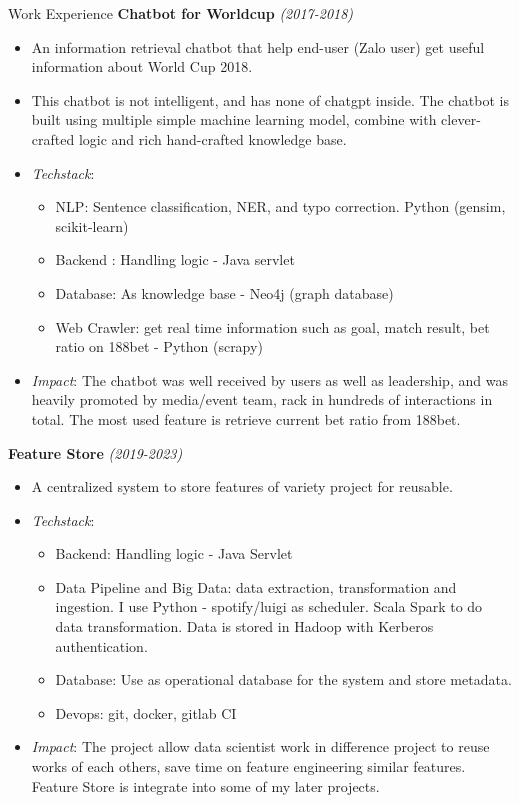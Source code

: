 \documentclass{resume} %
\begin{document}
\begin{rSection}{Work Experience}
\textbf{Chatbot for Worldcup} \textit{(2017-2018)}

\begin{itemize}
    \item An information retrieval chatbot that help end-user (Zalo user) get useful information about World Cup 2018.
    \item This chatbot is not intelligent, and has none of chatgpt inside. The chatbot is built using multiple simple machine learning model, combine with clever-crafted logic and rich hand-crafted knowledge base.
    \item \textit{Techstack}: 
    \begin{itemize}
            \item NLP: Sentence classification, NER, and typo correction. Python (gensim, scikit-learn)
            \item Backend : Handling logic - Java servlet
            \item Database: As knowledge base - Neo4j (graph database)
            \item Web Crawler: get real time information such as goal, match result, bet ratio on 188bet - Python (scrapy)
    \end{itemize}
    \item \textit{Impact}: The chatbot was well received by users as well as leadership, and was heavily promoted by media/event team, rack in hundreds of interactions in total. The most used feature is retrieve current bet ratio from 188bet.
\end{itemize}


\textbf{Feature Store} \textit{(2019-2023)}
\begin{itemize}
    \item A centralized system to store features of variety project for reusable.
    \item \textit{Techstack}:
    \begin{itemize}
        \item Backend: Handling logic - Java Servlet
        \item Data Pipeline and Big Data: data extraction, transformation and ingestion. I use Python - spotify/luigi as scheduler. Scala Spark to do data transformation. Data is stored in Hadoop with Kerberos authentication.
        \item Database: Use as operational database for the system and store metadata.
        \item Devops: git, docker, gitlab CI
    \end{itemize} 
    \item \textit{Impact}: The project allow data scientist work in difference project to reuse works of each others, save time on feature engineering similar features. Feature Store is integrate into some of my later projects.
\end{itemize}



\end{rSection}
\end{document}
